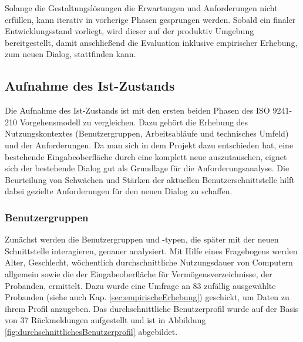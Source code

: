 Solange die Gestaltungslösungen die Erwartungen und Anforderungen nicht erfüllen, kann iterativ in vorherige Phasen gesprungen werden. Sobald ein finaler Entwicklungsstand vorliegt, wird dieser auf der produktiv Umgebung bereitgestellt, damit anschließend die Evaluation inklusive empirischer Erhebung, zum neuen Dialog, stattfinden kann.


\subsection{Aufnahme des Ist-Zustands}
Die Aufnahme des Ist-Zustands ist mit den ersten beiden Phasen des ISO 9241-210 Vorgehensmodell zu vergleichen. Dazu gehört die Erhebung des Nutzungskontextes (Benutzergruppen, Arbeitsabläufe und technisches Umfeld) und der Anforderungen. Da man sich in dem Projekt dazu entschieden hat, eine bestehende Eingabeoberfläche durch eine komplett neue auszutauschen, eignet sich der bestehende Dialog gut als Grundlage für die Anforderungsanalyse. Die Beurteilung von Schwächen und Stärken der aktuellen Benutzerschnittstelle hilft dabei gezielte Anforderungen für den neuen Dialog zu schaffen.


\subsubsection{Benutzergruppen}
\label{sec:benutzergruppen}
Zunächst werden die Benutzergruppen und -typen, die später mit der neuen Schnittstelle interagieren, genauer analysiert. Mit Hilfe eines Fragebogens werden Alter, Geschlecht, wöchentlich durchschnittliche Nutzungsdauer von Computern allgemein sowie die der Eingabeoberfläche für Vermögensverzeichnisse, der Probanden, ermittelt. Dazu wurde eine Umfrage an 83 zufällig ausgewählte Probanden (siehe auch Kap. \ref{sec:empirischeErhebung}) geschickt, um Daten zu ihrem Profil anzugeben. Das durchschnittliche Benutzerprofil wurde auf der Basis von 37 Rückmeldungen aufgestellt und ist in Abbildung \ref{fig:durchschnittlichesBenutzerprofil} abgebildet. 

